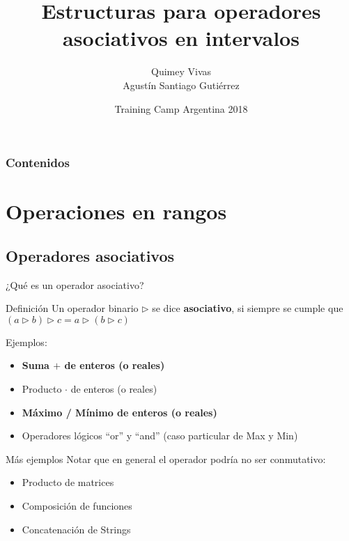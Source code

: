 \documentclass{beamer}
\title[Estructuras] %
{Estructuras para operadores asociativos en intervalos}
\author[Quimey Vivas] %
{Quimey Vivas \inst{1} \\ Agustín Santiago Gutiérrez}
\institute[Avature] %
{
  \inst{1}
  Avature Argentina
}
\date[TC Arg 2018] %
{Training Camp Argentina 2018}
\begin{document}
\begin{frame}
  \titlepage
\end{frame}

\begin{frame}
\footnotesize
\frametitle{Contenidos}
\begin{multicols}{2}
\tableofcontents
\end{multicols}
\end{frame}

\section{Operaciones en rangos} %

\subsection{Operadores asociativos}

\begin{frame}{¿Qué es un operador asociativo?}
  \begin{block}{Definición}
    Un operador binario $\triangleright$ se dice \textbf{asociativo}, si siempre se cumple que $(a \triangleright b) \triangleright c = a \triangleright (b \triangleright c)$
  \end{block}
  \pause
  Ejemplos:
  \begin{itemize}
  \item \textbf{Suma $+$ de enteros (o reales)}
  \item Producto $\cdot$ de enteros (o reales)
  \item \textbf{Máximo / Mínimo de enteros (o reales)}
  \item Operadores lógicos ``or'' y ``and'' (caso particular de Max y Min)
  \end{itemize}

\end{frame}

\begin{frame}{Más ejemplos}
  Notar que en general el operador podría no ser conmutativo:
  \begin{itemize}
  \item Producto de matrices
  \item Composición de funciones
  \item Concatenación de Strings
  \end{itemize}

\end{frame}
\end{document}
